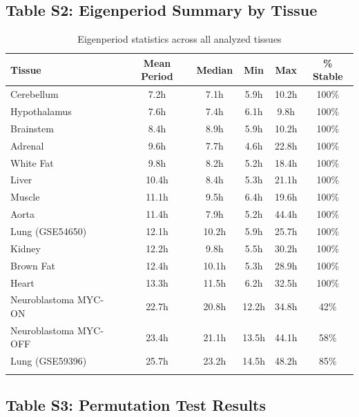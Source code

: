 \documentclass[11pt,a4paper]{article}
\begin{document}
\subsection{Table S2: Eigenperiod Summary by Tissue}

\begin{longtable}{lccccc}
\toprule
Tissue & Mean Period & Median & Min & Max & \% Stable \\
\midrule
\endfirsthead
Cerebellum & 7.2h & 7.1h & 5.9h & 10.2h & 100\% \\
Hypothalamus & 7.6h & 7.4h & 6.1h & 9.8h & 100\% \\
Brainstem & 8.4h & 8.9h & 5.9h & 10.2h & 100\% \\
Adrenal & 9.6h & 7.7h & 4.6h & 22.8h & 100\% \\
White Fat & 9.8h & 8.2h & 5.2h & 18.4h & 100\% \\
Liver & 10.4h & 8.4h & 5.3h & 21.1h & 100\% \\
Muscle & 11.1h & 9.5h & 6.4h & 19.6h & 100\% \\
Aorta & 11.4h & 7.9h & 5.2h & 44.4h & 100\% \\
Lung (GSE54650) & 12.1h & 10.2h & 5.9h & 25.7h & 100\% \\
Kidney & 12.2h & 9.8h & 5.5h & 30.2h & 100\% \\
Brown Fat & 12.4h & 10.1h & 5.3h & 28.9h & 100\% \\
Heart & 13.3h & 11.5h & 6.2h & 32.5h & 100\% \\
\midrule
Neuroblastoma MYC-ON & 22.7h & 20.8h & 12.2h & 34.8h & 42\% \\
Neuroblastoma MYC-OFF & 23.4h & 21.1h & 13.5h & 44.1h & 58\% \\
Lung (GSE59396) & 25.7h & 23.2h & 14.5h & 48.2h & 85\% \\
\bottomrule
\caption{Eigenperiod statistics across all analyzed tissues}
\end{longtable}

\subsection{Table S3: Permutation Test Results}
\end{document}
